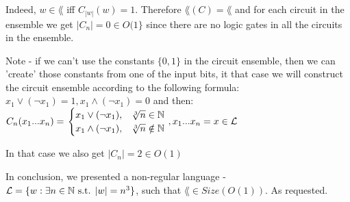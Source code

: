 Indeed, $w \in \lang$ iff $C_{|w|}(w)=1$.
Therefore $\lang(C)=\lang$ and for each circuit in the ensemble we get $|C_n| = 0 \in O(1\}$ since there are no logic
gates in all the circuits in the ensemble.

Note - if we can't use the constants $\{0, 1\}$ in the circuit ensemble, then we can 'create' those
constants from one of the input bits, it that case we will construct the circuit ensemble according
to the following formula:
$x_1 \vee  (\neg x_1) = 1, x_1 \wedge (\neg x_1) = 0$ and then:  \\
$
    C_n(x_1 ... x_n) = \left.
    \begin{cases}
        x_1 \vee  (\neg x_1) ,  & \sqrt[3]{n} \in \mathbb{N}    \\
        x_1 \wedge (\neg x_1) , & \sqrt[3]{n} \notin \mathbb{N} \\
    \end{cases}
    \right. , x_1...x_n = x \in \mathcal{L}
$

In that case we also get $|C_n| = 2 \in O(1)$

In conclusion, we presented a non-regular language - $\mathcal{L}=\{w : \exists n \in \mathbb{N} \text{ s.t. } |w| = n^3\}$,
such that $\lang \in Size(O(1))$. As requested.

